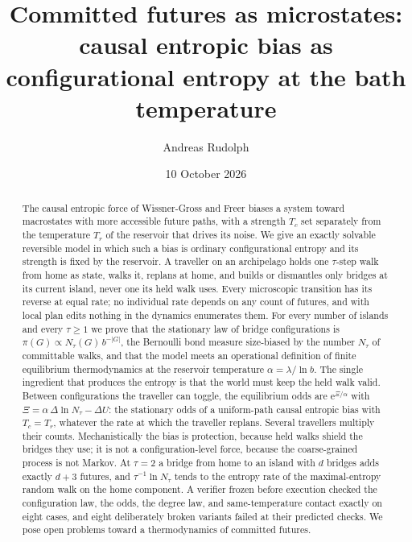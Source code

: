 \documentclass[aps,pre,preprint,superscriptaddress,nofootinbib]{revtex4-2}
\theoremstyle{definition}
\theoremstyle{remark}
\newcommand{\N}{N_\tau}
\newcommand{\e}{\mathrm{e}}
\begin{document}
\title{\texorpdfstring{Committed futures as microstates:\\ causal entropic bias as configurational entropy at the bath temperature}{Committed futures as microstates: causal entropic bias as configurational entropy at the bath temperature}}

\author{Andreas Rudolph}

\date{10 October 2026}

\begin{abstract}
The causal entropic force of Wissner-Gross and Freer biases a system toward macrostates with more accessible future paths, with a strength $T_c$ set separately from the temperature $T_r$ of the reservoir that drives its noise. We give an exactly solvable reversible model in which such a bias is ordinary configurational entropy and its strength is fixed by the reservoir. A traveller on an archipelago holds one $\tau$-step walk from home as state, walks it, replans at home, and builds or dismantles only bridges at its current island, never one its held walk uses. Every microscopic transition has its reverse at equal rate; no individual rate depends on any count of futures, and with local plan edits nothing in the dynamics enumerates them. For every number of islands and every $\tau\ge1$ we prove that the stationary law of bridge configurations is $\pi(G)\propto\N(G)\,b^{-|G|}$, the Bernoulli bond measure size-biased by the number $\N$ of committable walks, and that the model meets an operational definition of finite equilibrium thermodynamics at the reservoir temperature $\alpha=\lambda/\ln b$. The single ingredient that produces the entropy is that the world must keep the held walk valid. Between configurations the traveller can toggle, the equilibrium odds are $\e^{\Xi/\alpha}$ with $\Xi=\alpha\,\Delta\ln\N-\Delta U$: the stationary odds of a uniform-path causal entropic bias with $T_c=T_r$, whatever the rate at which the traveller replans. Several travellers multiply their counts. Mechanistically the bias is protection, because held walks shield the bridges they use; it is not a configuration-level force, because the coarse-grained process is not Markov. At $\tau=2$ a bridge from home to an island with $d$ bridges adds exactly $d+3$ futures, and $\tau^{-1}\ln\N$ tends to the entropy rate of the maximal-entropy random walk on the home component. A verifier frozen before execution checked the configuration law, the odds, the degree law, and same-temperature contact exactly on eight cases, and eight deliberately broken variants failed at their predicted checks. We pose open problems toward a thermodynamics of committed futures.
\end{abstract}
\end{document}
